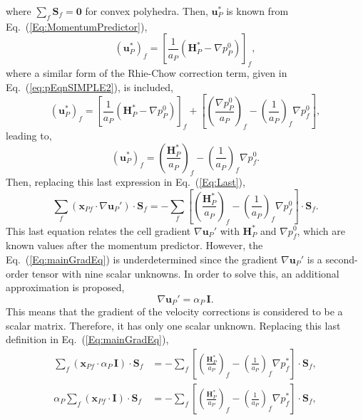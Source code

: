 \documentclass[final,3p,times,11pt,onecolumn]{myElsarticle}
\numberwithin{equation}{section}
\begin{document}
where $\sum_f \boldsymbol{S}_f = \boldsymbol{0}$ for convex polyhedra. Then, $\boldsymbol{u}_P^{*}$ is known from Eq.~(\ref{Eq:MomentumPredictor}),
\begin{equation}
\left(
\boldsymbol{u}_P^{*}
\right)_{f}
=
\left[\frac{1}{a_P}\left(\boldsymbol{H}_P^* - \nabla p_P^{0}\right)\right]_f,
\end{equation}
where a similar form of the Rhie-Chow correction term, given in Eq.~(\ref{eq:pEqnSIMPLE2}), is included,
\begin{equation}
\left(
\boldsymbol{u}_P^{*}
\right)_{f}
=
\left[\frac{1}{a_P}\left(\boldsymbol{H}_P^* - \nabla p_P^{0}\right)\right]_f
+
\left[
\left(
\frac{\nabla p_P^{0}}{a_P}
\right)_f
- 
\left(
\frac{1}{a_P}
\right)_f 
\nabla p_f^{0} 
\right],
\end{equation}
leading to, 
\begin{equation}
\left(
\boldsymbol{u}_P^{*}
\right)_{f}
=
 \left(\frac{\boldsymbol{H}_P^*}{a_P}\right)_f 
 -
 \left(\frac{1}{a_P}\right)_f \nabla p_f^{0}.
\end{equation}
Then, replacing this last expression in Eq.~(\ref{Eq:Last}),
\begin{equation}
\label{Eq:mainGradEq}
\sum_f 
\left(
\boldsymbol{x}_{Pf}
\cdot 
\nabla \boldsymbol{u}_P'
\right)
\cdot 
\boldsymbol{S}_f
=
-\sum_f
\left[
\left(\frac{\boldsymbol{H}_P^*}{a_P}\right)_f 
 -
 \left(\frac{1}{a_P}\right)_f \nabla p_f^{0}
 \right]
\cdot 
\boldsymbol{S}_f.
\end{equation}
This last equation relates the cell gradient $\nabla \boldsymbol{u}_P'$ with $\boldsymbol{H}_P^*$ and $\nabla p_f^{0}$, which are known values after the momentum predictor. However, the Eq.~(\ref{Eq:mainGradEq}) is underdetermined since the gradient $\nabla \boldsymbol{u}_P'$ is a second-order tensor with nine scalar unknowns. In order to solve this, an additional approximation is proposed,
\begin{equation}
\nabla \boldsymbol{u}_P'
=
\alpha_P\,
\boldsymbol{I}.
\label{eq:gradApprox}
\end{equation}
This means that the gradient of the velocity corrections is considered to be a scalar matrix. Therefore, it has only one scalar unknown.
Replacing this last definition in Eq.~(\ref{Eq:mainGradEq}),
\begin{align}
\sum_f 
\left(
\boldsymbol{x}_{Pf}
\cdot 
\alpha_P\,
\boldsymbol{I}
\right)
\cdot 
\boldsymbol{S}_f
&=
-\sum_f
\left[
\left(\frac{\boldsymbol{H}_P^*}{a_P}\right)_f 
 -
 \left(\frac{1}{a_P}\right)_f \nabla p_f^{*}
 \right]
\cdot 
\boldsymbol{S}_f,
\\
\alpha_P
\sum_f 
\left(
\boldsymbol{x}_{Pf}
\cdot 
\boldsymbol{I}
\right)
\cdot 
\boldsymbol{S}_f
&=
-\sum_f
\left[
\left(\frac{\boldsymbol{H}_P^*}{a_P}\right)_f 
 -
 \left(\frac{1}{a_P}\right)_f \nabla p_f^{*}
 \right]
\cdot 
\boldsymbol{S}_f,
\end{align}
\end{document}
